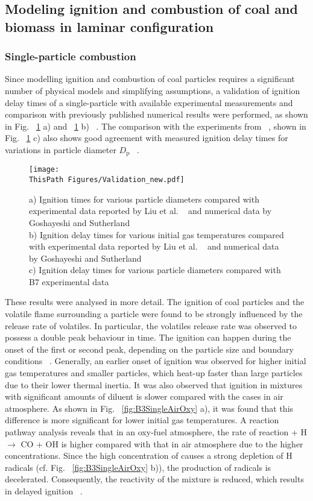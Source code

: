 \begin{btUnit}
\subsection{Modeling ignition and combustion of coal and biomass in laminar configuration} 
\subsubsection{Single-particle combustion}
Since modelling ignition and combustion of coal particles requires a significant number of physical models and simplifying assumptions, a validation of ignition delay times of a single-particle with available experimental measurements and comparison with previously published numerical results were performed, as shown in Fig. ~\ref{fig:B3SingleValidation} a) and ~\ref{fig:B3SingleValidation} b) ~\cite{Attili2020, Farazi2019a}. The comparison with the experiments from ~, shown in Fig. ~\ref{fig:B3SingleValidation} c) also shows good agreement with measured ignition delay times for variations in particle diameter $D_\mathrm{p}$ ~\cite{Attili2020, Li2021}.
\begin{figure}
	\texttt{[image: \\ThisPath Figures/Validation\_new.pdf]}
	\caption{a) Ignition times for various particle diameters compared with experimental data reported by Liu et al. ~\cite{Liu2011} and numerical data by Goshayeshi and Sutherland ~\cite{Goshayeshi2014}\\b) Ignition delay times for various initial gas temperatures compared with experimental data reported by Liu et al. ~\cite{Liu2011} and numerical data by Goshayeshi and Sutherland ~\cite{Goshayeshi2014}\\c) Ignition delay times for various particle diameters compared with B7 experimental data ~\cite{Attili2020}}\label{fig:B3SingleValidation}
\end{figure}
These results were analysed in more detail. The ignition of coal particles and the volatile flame surrounding a particle were found to be strongly influenced by the release rate of volatiles. In particular, the volatiles release rate was observed to possess a double peak behaviour in time. The ignition can happen during the onset of the first or second peak, depending on the particle size and boundary conditions ~\cite{Farazi2019a}. Generally, an earlier onset of ignition was observed for higher initial gas temperatures and smaller particles, which heat-up faster than large particles due to their lower thermal inertia. It was also observed that ignition in mixtures with significant amounts of  diluent is slower compared with the cases in air atmosphere. As shown in Fig. ~\ref{fig:B3SingleAirOxy} a), it was found that this difference is more significant for lower initial gas temperatures. A reaction pathway analysis reveals that in an oxy-fuel atmosphere, the rate of reaction  + H $\rightarrow$ CO + OH is higher compared with that in air atmosphere due to the higher  concentrations. Since the high concentration of  causes a strong depletion of H radicals (cf. Fig. ~\ref{fig:B3SingleAirOxy} b)), the production of radicals is decelerated. Consequently, the reactivity of the mixture is reduced, which results in delayed ignition ~\cite{Farazi2019a}.

\end{btUnit}
